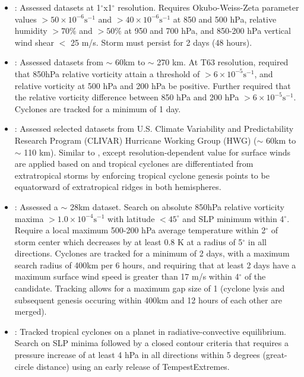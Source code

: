 \documentclass[gmdd, hvmath]{copernicus}
\begin{document}
\begin{itemize}
\item \cite{tory2013vorticity,tory2013tracking,tory2013cmip}:  Assessed datasets at 1$^\circ$x1$^\circ$ resolution. Requires Okubo-Weiss-Zeta parameter values $> 50 \times 10^{-6} \mbox{s}^{-1}$ and $> 40 \times 10^{-6} \mbox{s}^{-1}$ at 850 and 500 hPa, relative humidity $> 70\%$ and $> 50\%$ at 950 and 700 hPa, and 850-200 hPa vertical wind shear $<$ 25 m/s. Storm must persist for 2 days (48 hours).

\item \cite{strachan2013investigating}:  Assessed datasets from $\sim$ 60km to $\sim$ 270 km.  At T63 resolution, required that 850hPa relative vorticity attain a threshold of $> 6 \times 10^{-5} \mbox{s}^{-1}$, and relative vorticity at 500 hPa and 200 hPa be positive.  Further required that the relative vorticity difference between 850 hPa and 200 hPa $> 6 \times 10^{-5} \mbox{s}^{-1}$.  Cyclones are tracked for a minimum of 1 day.

\item \cite{horn2014tracking}:  Assessed selected datasets from U.S. Climate Variability and Predictability Research Program (CLIVAR) Hurricane Working Group (HWG) \citep{Walsh2015CLIVAR} ($\sim$ 60km to $\sim$ 110 km). Similar to \citet{walsh2004fine}, except resolution-dependent value for surface winds are applied based on \citet{walsh2007objectively} and tropical cyclones are differentiated from extratropical storms by enforcing tropical cyclone genesis points to be equatorward of extratropical ridges in both hemispheres.

\item \cite{zarzycki2014multidecadal}:  Assessed a $\sim$ 28km dataset.  Search on absolute 850hPa relative vorticity maxima $> 1.0 \times 10^{-4} \mbox{s}^{-1}$ with latitude $< 45^\circ$ and SLP minimum within 4$^\circ$. Require a local maximum 500-200 hPa average temperature within 2$^\circ$ of storm center which decreases by at least 0.8 K at a radius of 5$^\circ$ in all directions.  Cyclones are tracked for a minimum of 2 days, with a maximum search radius of 400km per 6 hours, and requiring that at least 2 days have a maximum surface wind speed is greater than 17 m/s within 4$^\circ$ of the candidate. Tracking allows for a maximum gap size of 1 (cyclone lysis and subsequent genesis occuring within 400km and 12 hours of each other are merged).

\item \cite{reed2015uniformly}:  Tracked tropical cyclones on a planet in radiative-convective equilibrium.  Search on SLP minima followed by a closed contour criteria that requires a pressure increase of at least 4 hPa in all directions within 5 degrees (great-circle distance) using an early release of TempestExtremes.


\end{itemize}
\end{document}
